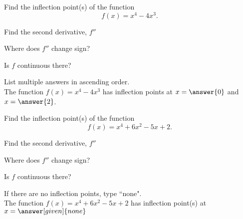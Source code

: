 \documentclass{ximera}
\begin{document}
\begin{problem} %
  Find the inflection point(s) of the function
  \[
     f(x) = x^4 - 4x^3.
  \]
  
    \begin{hint}
      Find the second derivative, $f''$
    \end{hint}
    \begin{hint}
      Where does $f''$ change sign?
    \end{hint}
    \begin{hint}
      Is $f$ continuous there?
    \end{hint}  
		
		List multiple answers in ascending order.\\
		The function $f(x) = x^4 - 4x^3$ has inflection points at 
		$x =\answer{0}$ and $x = \answer{2}$.
		
	
\end{problem}


\begin{problem} %
  Find the inflection point(s) of the function
  \[
     f(x) = x^4 + 6x^2 - 5x + 2.
  \]
  
    \begin{hint}
      Find the second derivative, $f''$
    \end{hint}
    \begin{hint}
      Where does $f''$ change sign?
    \end{hint}
    \begin{hint}
      Is $f$ continuous there?
    \end{hint}  
		If there are no inflection points, type ``none".\\ 
		The function $f(x) = x^4 + 6x^2 - 5x + 2$ has inflection 
		point(s) at $x =\answer[given]{none}$
	
\end{problem}
\end{document}
